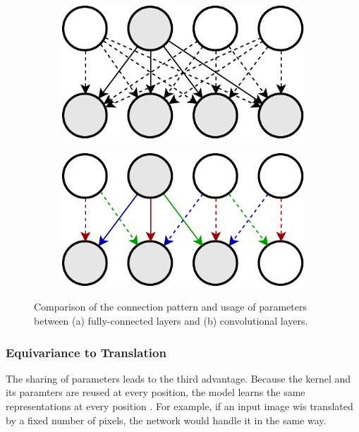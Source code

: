 \begin{figure}[htpb]
\centering
\begin{subfigure}{0.5\textwidth}
  \centering
  \includegraphics[width=.8\linewidth]{figures/fc2.pdf}
  \caption{}
  \label{fig:conv_vs_fc_fc}
\end{subfigure}%
\begin{subfigure}{0.5\textwidth}
  \centering
  \includegraphics[width=0.8\linewidth]{figures/param_share.pdf}
  \caption{}
  \label{fig:conv_vs_fc_conv}
\end{subfigure}
\caption[Sparse connections and parameter sharing in a CNN]{Comparison of the connection pattern and usage of parameters between (a) fully-connected layers and (b) convolutional layers.}
\label{fig:conv_vs_fc}
\end{figure}

\subsubsection*{Equivariance to Translation}
The sharing of parameters leads to the third advantage. Because the kernel and its paramters are reused at every position, the model learns the same representations at every position \parencite[p. 339]{deep_learning}. For example, if an input image wis translated by a fixed number of pixels, the network would handle it in the same way.

